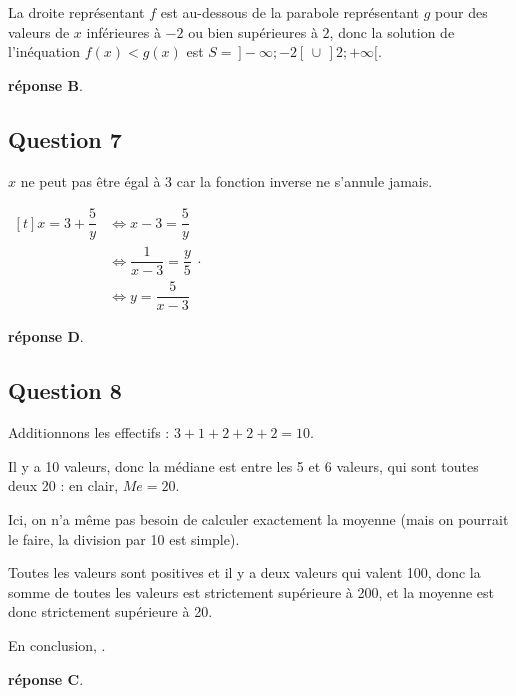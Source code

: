 	La droite représentant $f$ est au-dessous de la parabole représentant $g$ pour des valeurs de $x$ inférieures à $-2$ ou bien supérieures à $2$, donc la solution de l'inéquation {$f(x)<g(x)$} est {$S=\,]-\infty ; -2[\,\cup\,]2 ; +\infty[$}.

	\textbf{réponse B}.

\subsection*{Question 7}
	$x$ ne peut pas être égal à $3$ car la fonction inverse ne s'annule jamais.

	{$\begin{aligned}[t]
			x=3+\dfrac5 y
			&\iff x-3=\dfrac 5 y\\
			&\iff \dfrac{1}{x-3}=\dfrac y 5\\
			&\iff y=\dfrac{5}{x-3}
		\end{aligned}$}.

	\textbf{réponse D}.

\subsection*{Question 8}
	Additionnons les effectifs : \quad $3 + 1 + 2 + 2 + 2 = 10$.

	Il y a 10 valeurs, donc la médiane est entre les 5 et 6 valeurs, qui sont toutes deux 20 : en clair, $\textit{Me} =20 $.

	Ici, on n'a même pas besoin de calculer exactement la moyenne (mais on pourrait le faire, la division par 10 est simple).

	Toutes les valeurs sont positives et il y a deux valeurs qui valent 100, donc la somme de toutes les valeurs est strictement supérieure à 200, et la moyenne est donc strictement supérieure à 20.

	En conclusion, .

	\textbf{réponse C}.
